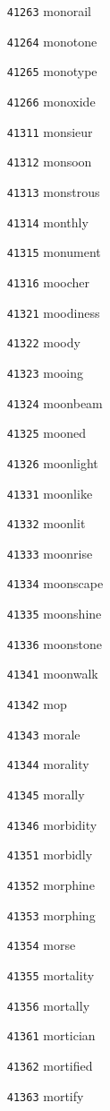 \documentclass[twoside,11pt]{article}
\begin{document}
\begin{multicols}{5}
\begin{enumerate}
\item[\texttt{41263}] monorail
\item[\texttt{41264}] monotone
\item[\texttt{41265}] monotype
\item[\texttt{41266}] monoxide
\item[\texttt{41311}] monsieur
\item[\texttt{41312}] monsoon
\item[\texttt{41313}] monstrous
\item[\texttt{41314}] monthly
\item[\texttt{41315}] monument
\item[\texttt{41316}] moocher
\item[\texttt{41321}] moodiness
\item[\texttt{41322}] moody
\item[\texttt{41323}] mooing
\item[\texttt{41324}] moonbeam
\item[\texttt{41325}] mooned
\item[\texttt{41326}] moonlight
\item[\texttt{41331}] moonlike
\item[\texttt{41332}] moonlit
\item[\texttt{41333}] moonrise
\item[\texttt{41334}] moonscape
\item[\texttt{41335}] moonshine
\item[\texttt{41336}] moonstone
\item[\texttt{41341}] moonwalk
\item[\texttt{41342}] mop
\item[\texttt{41343}] morale
\item[\texttt{41344}] morality
\item[\texttt{41345}] morally
\item[\texttt{41346}] morbidity
\item[\texttt{41351}] morbidly
\item[\texttt{41352}] morphine
\item[\texttt{41353}] morphing
\item[\texttt{41354}] morse
\item[\texttt{41355}] mortality
\item[\texttt{41356}] mortally
\item[\texttt{41361}] mortician
\item[\texttt{41362}] mortified
\item[\texttt{41363}] mortify

\end{enumerate}
\end{multicols}
\end{document}
